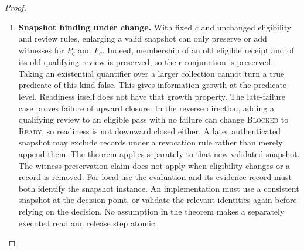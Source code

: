 \begin{proof}
\begin{enumerate}
\begin{enumerate}
\textsc{Blocked}. Consequently the pass bit alone is
insufficient, even with only one required check.
\item Drop the reviewed-pass bit while retaining the
eligible-failure bit.
Compare a reviewed pass with a snapshot missing its review.
Both have false failure flags.
The results are respectively \textsc{Ready} and
\textsc{Blocked}, so the failure bit alone is insufficient.
\end{enumerate}
These examples show necessity of the distinctions for the
stated gate decision under the specified projections.
They do not claim minimal byte length for a receipt format,
or rule out an alternative encoding of the same information.

\item \textbf{Snapshot binding under change.}
With fixed $c$ and unchanged eligibility and review rules,
enlarging a valid snapshot can only preserve or add
witnesses for $P_q$ and $F_q$.
Indeed, membership of an old eligible receipt and of its
old qualifying review is preserved, so their conjunction is
preserved.
Taking an existential quantifier over a larger collection
cannot turn a true predicate of this kind false.
This gives information growth at the predicate level.
Readiness itself does not have that growth property.
The late-failure case proves failure of upward closure.
In the reverse direction, adding a qualifying review to an
eligible pass with no failure can change \textsc{Blocked}
to \textsc{Ready}, so readiness is not downward closed either.
A later authenticated snapshot may exclude records under
a revocation rule rather than merely append them.
The theorem applies separately to that new validated
snapshot. The witness-preservation claim does not apply
when eligibility changes or a record is removed.
For local use the evaluation and its evidence record must
both identify the snapshot instance.
An implementation must use a consistent snapshot at the
decision point, or validate the relevant identities again
before relying on the decision.
No assumption in the theorem makes a separately
executed read and release step atomic.


\end{enumerate}
\end{proof}

